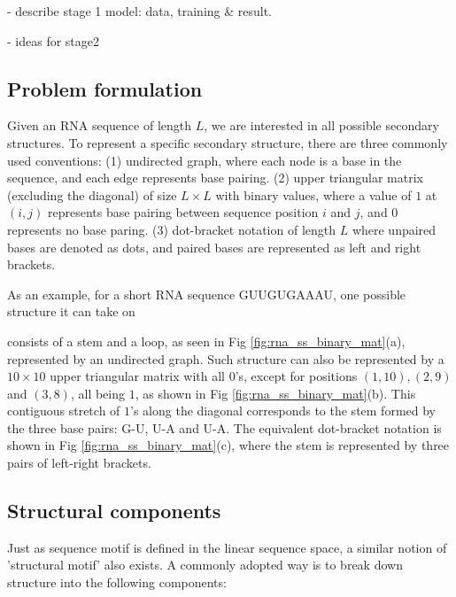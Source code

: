 \documentclass{article}
\begin{document}
- describe stage 1 model: data, training & result.


- ideas for stage2


\subsection{Problem formulation}

Given an RNA sequence of length $L$, we are interested in all possible secondary structures.
To represent a specific secondary structure, there are three commonly used conventions:
(1) undirected graph, where each node is a base in the sequence, and each edge represents base pairing.
(2) upper triangular matrix (excluding the diagonal)
of size $L \times L$ with binary values, where a value of $1$ at $(i, j)$ represents
base pairing between sequence position $i$ and $j$, and $0$ represents no base paring.
(3) dot-bracket notation of length $L$ where unpaired bases are denoted as dots,
    and paired bases are represented as left and right brackets.


As an example, for a short RNA sequence GUUGUGAAAU, one possible structure it can take on

consists of a stem and a loop, as seen in Fig \ref{fig:rna_ss_binary_mat}(a), represented by an undirected graph.
Such structure can also be represented by a $10 \times 10$ upper triangular matrix with all $0$'s,
except for positions
$(1, 10), (2, 9)$ and $(3, 8)$,
all being $1$, as shown in Fig \ref{fig:rna_ss_binary_mat}(b).
This contiguous stretch of $1$'s along the diagonal corresponds to the stem formed by the three base pairs: G-U, U-A and U-A.
The equivalent dot-bracket notation is shown in Fig \ref{fig:rna_ss_binary_mat}(c), where the stem is represented
by three pairs of left-right brackets.



\subsection{Structural components}

Just as sequence motif is defined in the linear sequence space,
a similar notion of 'structural motif' also exists.
A commonly adopted way is to break down structure into the following components:
\end{document}
